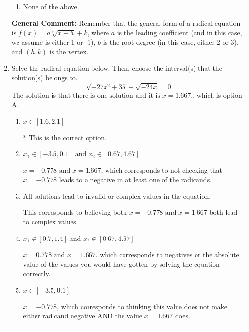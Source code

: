 \documentclass{extbook}[14pt]
\newcommand{\litem}[1]{\item #1

\rule{\textwidth}{0.4pt}}
\begin{document}
\begin{enumerate}
{\begin{enumerate}[label=\Alph*.]
\item None of the above.\end{enumerate}
\textbf{General Comment:} Remember that the general form of a radical equation is $ f(x) = a \sqrt[b]{x - h} + k $, where $a$ is the leading coefficient (and in this case, we assume is either 1 or -1), $b$ is the root degree (in this case, either 2 or 3), and $(h, k)$ is the vertex.
}
\litem{
Solve the radical equation below. Then, choose the interval(s) that the solution(s) belongs to.
\[ \sqrt{-27 x^2 + 35} - \sqrt{-24 x} = 0 \]The solution is \( \text{that there is one solution and it is } x = 1.667. \), which is option A.\begin{enumerate}[label=\Alph*.]
\item \( x \in [1.6,2.1] \)

* This is the correct option.
\item \( x_1 \in [-3.5, 0.1] \text{ and } x_2 \in [0.67,4.67] \)

$x = -0.778 \text{ and } x = 1.667$, which corresponds to not checking that $x = -0.778$ leads to a negative in at least one of the radicands.
\item \( \text{All solutions lead to invalid or complex values in the equation.} \)

This corresponds to believing both $x = -0.778 \text{ and } x = 1.667$ both lead to complex values.
\item \( x_1 \in [0.7, 1.4] \text{ and } x_2 \in [0.67,4.67] \)

$x = 0.778 \text{ and } x = 1.667$, which corresponds to negatives or the absolute value of the values you would have gotten by solving the equation correctly.
\item \( x \in [-3.5,0.1] \)

$x = -0.778$, which corresponds to thinking this value does not make either radicand negative AND the value $x = 1.667$ does.
\end{enumerate}

}
\end{enumerate}
\end{document}
